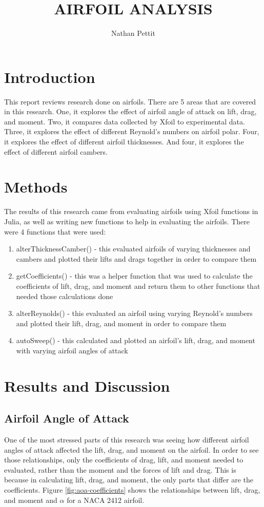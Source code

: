 \documentclass{journal}
\title{AIRFOIL ANALYSIS}
\author{Nathan Pettit}
\begin{document}
	
	\maketitle	
	
	\section{Introduction}
	This report reviews research done on airfoils. There are 5 areas that are covered in this research. One, it explores the effect of airfoil angle of attack on lift, drag, and moment. Two, it compares data collected by Xfoil to experimental data. Three, it explores the effect of different Reynold's numbers on airfoil polar. Four, it explores the effect of different airfoil thicknesses. And four, it explores the effect of different airfoil cambers.
	
	\section{Methods}
	The results of this research came from evaluating airfoils using Xfoil functions in Julia, as well as writing new functions to help in evaluating the airfoils. There were 4 functions that were  used:
	
	\begin{enumerate}
		\item alterThicknessCamber() - this evaluated airfoils of varying thicknesses and cambers and plotted their lifts and drags together in order to compare them
		\item getCoefficients() - this was a helper function that was used to calculate the coefficients of lift, drag, and moment and return them to other functions that needed those calculations done
		\item alterReynolds() - this evaluated an airfoil using varying Reynold's numbers and plotted their lift, drag, and moment in order to compare them
		\item autoSweep() - this calculated and plotted an airfoil's lift, drag, and moment with varying airfoil angles of attack
	\end{enumerate}
	
	\section{Results and Discussion}
	
	\subsection{Airfoil Angle  of Attack}
	One of the most stressed parts of this research was seeing how different airfoil angles of attack affected the lift, drag, and moment on the airfoil. In order to see those relationships, only the coefficients of drag, lift, and moment needed to evaluated, rather than the moment and the forces of lift and drag. This is because in calculating lift, drag, and moment, the only parts that differ are the coefficients. Figure \ref{fig:aoa-coefficients} shows the relationships between lift, drag, and moment and \(\alpha\) for a NACA 2412 airfoil.
	
\end{document}
